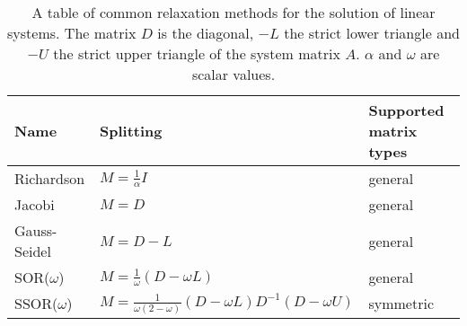 \begin{table}
\begin{center}
\begin{tabular}{lll}
Name & Splitting & Supported matrix types \\
\midrule
Richardson & 
    $M = \frac{1}{\alpha}I$ &
    general \\[1em]
Jacobi &
    $M = D$ &
    general \\[1em]
Gauss-Seidel &
    $M = D - L$ &
general \\[1em]
SOR($\omega$) &
    $M = \frac{1}{\omega}(D - \omega L)$ &
general \\[1em]
SSOR($\omega$) &
    $M = \frac{1}{\omega(2 - \omega)}(D - \omega L)D^{-1}(D - \omega U)$ &
symmetric \\[1em]
\end{tabular}
\end{center}
\caption{A table of common relaxation methods for the solution of linear
systems. The matrix $D$ is the diagonal, $-L$ the strict lower triangle and $-U$
the strict upper triangle of the system matrix $A$. $\alpha$ and $\omega$ are
scalar values.}
\label{introduction:tab:relaxation-methods}
\end{table}

